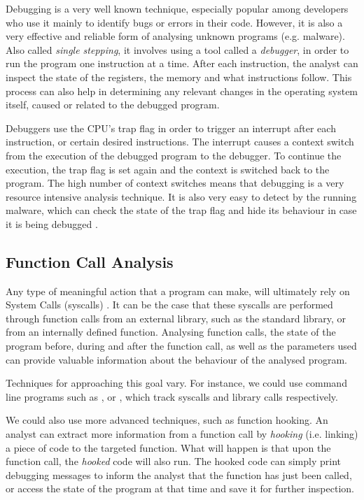 Debugging is a very well known technique, especially popular among developers who use it mainly to identify bugs or errors in their code. However, it is also a very effective and reliable form of analysing unknown programs (e.g. malware). Also called \emph{single stepping}, it involves using a tool called a \emph{debugger}, in order to run the program one instruction at a time. After each instruction, the analyst can inspect the state of the registers, the memory and what instructions follow. This process can also help in determining any relevant changes in the operating system itself, caused or related to the debugged program.

Debuggers use the CPU's trap flag in order to trigger an interrupt after each instruction, or certain desired instructions. The interrupt causes a context switch from the execution of the debugged program to the debugger. To continue the execution, the trap flag is set again and the context is switched back to the program. The high number of context switches means that debugging is a very resource intensive analysis technique. It is also very easy to detect by the running malware, which can check the state of the trap flag and hide its behaviour in case it is being debugged \cite{da_survey_2019}.

\subsection{Function Call Analysis}

Any type of meaningful action that a program can make, will ultimately rely on System Calls (syscalls) \cite{syscall}. It can be the case that these syscalls are performed through function calls from an external library, such as the standard  library, or from an internally defined function. Analysing function calls, the state of the program before, during and after the function call, as well as the parameters used can provide valuable information about the behaviour of the analysed program. 

Techniques for approaching this goal vary. For instance, we could use command line programs such as , or , which track syscalls and library calls respectively. 

We could also use more advanced techniques, such as function hooking. An analyst can extract more information from a function call by \emph{hooking} (i.e. linking) a piece of code to the targeted function. What will happen is that upon the function call, the \emph{hooked} code will also run. The hooked code can simply print debugging messages to inform the analyst that the function has just been called, or access the state of the program at that time and save it for further inspection. \cite{da_survey_2019}

